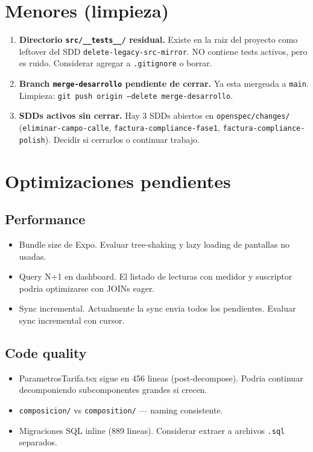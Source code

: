 \documentclass[11pt,a4paper,oneside]{report}
\begin{document}
\section{Menores (limpieza)}

\begin{enumerate}[leftmargin=*]
    \item \textbf{Directorio \texttt{src/\_\_tests\_\_/} residual.} Existe en la raiz del proyecto como leftover del SDD \texttt{delete-legacy-src-mirror}. NO contiene tests activos, pero es ruido. Considerar agregar a \texttt{.gitignore} o borrar.
    \item \textbf{Branch \texttt{merge-desarrollo} pendiente de cerrar.} Ya esta mergeada a \texttt{main}. Limpieza: \texttt{git push origin --delete merge-desarrollo}.
    \item \textbf{SDDs activos sin cerrar.} Hay 3 SDDs abiertos en \texttt{openspec/changes/} (\texttt{eliminar-campo-calle}, \texttt{factura-compliance-fase1}, \texttt{factura-compliance-polish}). Decidir si cerrarlos o continuar trabajo.
\end{enumerate}

\section{Optimizaciones pendientes}

\subsection*{Performance}
\begin{itemize}[leftmargin=*]
    \item Bundle size de Expo. Evaluar tree-shaking y lazy loading de pantallas no usadas.
    \item Query N+1 en dashboard. El listado de lecturas con medidor y suscriptor podria optimizarse con JOINs eager.
    \item Sync incremental. Actualmente la sync envia todos los pendientes. Evaluar sync incremental con cursor.
\end{itemize}

\subsection*{Code quality}
\begin{itemize}[leftmargin=*]
    \item ParametrosTarifa.tsx sigue en 456 lineas (post-decompose). Podria continuar decomponiendo subcomponentes grandes si crecen.
    \item \texttt{composicion/} vs \texttt{composition/} --- naming consistente.
    \item Migraciones SQL inline (889 lineas). Considerar extraer a archivos \texttt{.sql} separados.
\end{itemize}
\end{document}
